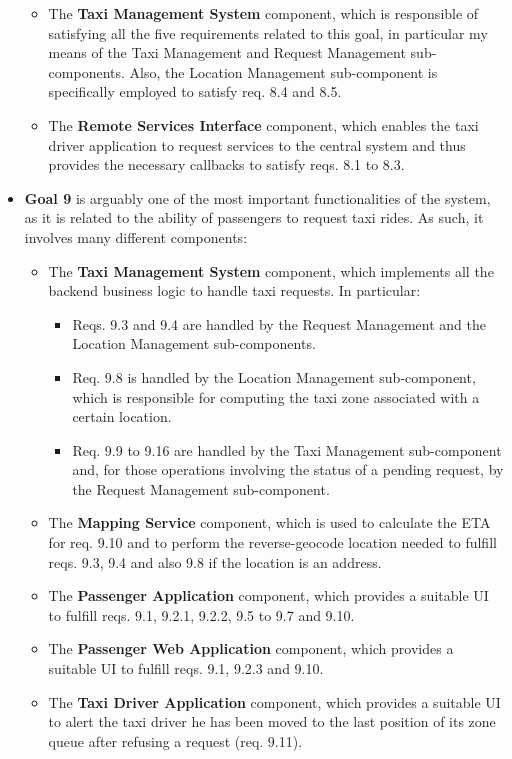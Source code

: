 \begin{itemize}
\begin{itemize}
	\item The \textbf{Taxi Management System} component, which is responsible of satisfying all the five requirements related to this goal, in particular my means of the Taxi Management and Request Management sub-components. Also, the Location Management sub-component is specifically employed to satisfy req. 8.4 and 8.5.
	\item The \textbf{Remote Services Interface} component, which enables the taxi driver application to request services to the central system and thus provides the necessary callbacks to satisfy reqs. 8.1 to 8.3.
	\end{itemize}
	\item \textbf{Goal 9} is arguably one of the most important functionalities of the system, as it is related to the ability of passengers to request taxi rides. As such, it involves many different components:
	\begin{itemize}
		\item The \textbf{Taxi Management System} component, which implements all the backend business logic to handle taxi requests. In particular:
		\begin{itemize}
		\item Reqs. 9.3 and 9.4 are handled by the Request Management and the Location Management sub-components.
		\item Req. 9.8 is handled by the Location Management sub-component, which is responsible for computing the taxi zone associated with a certain location.
		\item Req. 9.9 to 9.16 are handled by the Taxi Management sub-component and, for those operations involving the status of a pending request, by the Request Management sub-component.
		\end{itemize}
		\item The \textbf{Mapping Service} component, which is used to calculate the ETA for req. 9.10 and to perform the reverse-geocode location needed to fulfill reqs. 9.3, 9.4 and also 9.8 if the location is an address.
		\item The \textbf{Passenger Application} component, which provides a suitable UI to fulfill reqs. 9.1, 9.2.1, 9.2.2, 9.5 to 9.7 and 9.10.
		\item The \textbf{Passenger Web Application} component, which provides a suitable UI to fulfill reqs. 9.1, 9.2.3 and 9.10.
		\item The \textbf{Taxi Driver Application} component, which provides a suitable UI to alert the taxi driver he has been moved to the last position of its zone queue after refusing a request (req. 9.11).

\end{itemize}
\end{itemize}
